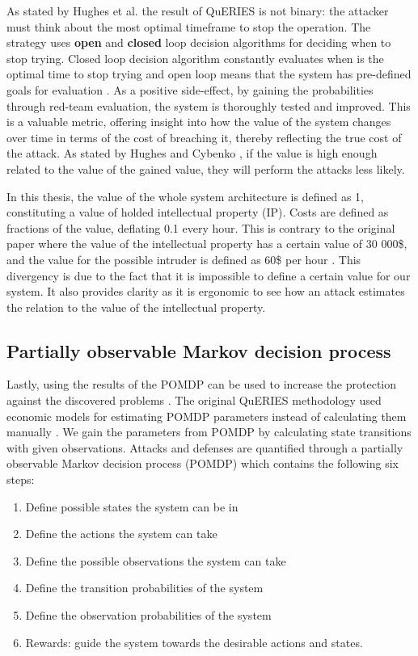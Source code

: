 As stated by Hughes et al. \cite{hughes2013quantitative} the result of QuERIES is not binary: the
attacker must think about the most optimal timeframe to stop the
operation. The strategy uses
\textbf{open} and \textbf{closed} loop decision algorithms for
deciding when to stop trying. Closed loop decision algorithm
constantly evaluates when is the optimal time to stop trying and open
loop means that the system has pre-defined goals for evaluation
\cite{carin2008cybersecurity}. As a positive side-effect, by gaining
the probabilities through red-team evaluation, the system is
thoroughly tested and improved. This is a valuable metric, offering
insight into how the value of the system changes over time in terms of
the cost of breaching it, thereby reflecting the true cost of the
attack. As stated by Hughes and Cybenko \cite{hughes2013quantitative}, if the value is high enough
related to the value of the gained value, they will
perform the attacks less likely.

In this thesis, the value of the whole system architecture is
defined as 1, constituting a value of holded intellectual
property (IP). Costs are defined as fractions of the value, deflating 
0.1 every hour. This is contrary to the original paper where the
value of the intellectual property has a certain value of 30 000\$, and
the value for the possible intruder is defined as 60\$ per hour
\cite{carin2008cybersecurity}. This divergency is due to the fact
that it is impossible to define a certain value for our system.
It also provides clarity as it is ergonomic to see how an attack
estimates the relation to the value of the intellectual property. 

\subsection{Partially observable Markov decision process}

Lastly, using the results of the POMDP can be used to increase the
protection against the discovered problems
\cite{carin2008cybersecurity}. The original QuERIES methodology used
economic models for estimating POMDP parameters instead of
calculating them manually \cite{carin2008cybersecurity}. We gain the
parameters from POMDP by calculating state transitions with given
observations. Attacks and defenses are quantified through a partially
observable Markov decision process (POMDP) which contains the following six
steps:

\begin{enumerate}
    \item Define possible states the system can be in
    \item Define the actions the system can take
    \item Define the possible observations the system can take
    \item Define the transition probabilities of the system
    \item Define the observation probabilities of the system
    \item Rewards: guide the system towards the desirable actions and
      states.
\end{enumerate} \cite{hughes2013quantitative}


